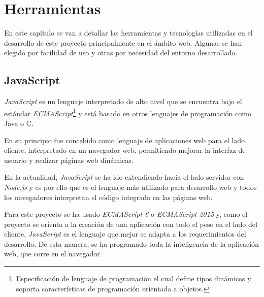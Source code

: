 \chapter{Herramientas}
\label{chap:herramientas}
En este capítulo se van a detallar las herramientas y tecnologías utilizadas en el desarrollo de este proyecto principalmente en el ámbito web. Algunas se han elegido por facilidad de uso y otras por necesidad del entorno desarrollado.

\section{JavaScript}
\label{sec:js}
\textit{JavaScript} es un lenguaje interpretado de alto nivel que se encuentra bajo el estándar \textit{ECMAScript}\footnote{Especificación de lenguaje de programación el cual define tipos dinámicos y soporta características de programación orientada a objetos.} y está basado en otros lenguajes de programación como Java o C. 

En su principio fue concebido como lenguaje de aplicaciones web para el lado cliente, interpretado en un navegador web, permitiendo mejorar la interfaz de usuario y realizar páginas web dinámicas. 

En la actualidad, \textit{JavaScript} se ha ido extendiendo hacia el lado servidor con \textit{Node.js} y es por ello que es el lenguaje más utilizado para desarrollo web y todos los navegadores interpretan el código integrado en las páginas web.

Para este proyecto se ha usado \textit{ECMAScript 6} o \textit{ECMAScript 2015} y, como el proyecto se orienta a la creación de una aplicación con todo el peso en el lado del cliente, \textit{JavaScript} es el lenguaje que mejor se adapta a los requerimientos del desarrollo. De esta manera, se ha programado toda la inteligencia de la aplicación web, que corre en el navegador. 


